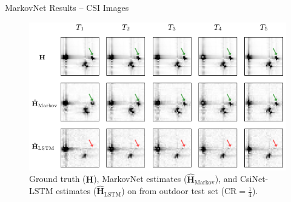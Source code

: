 \documentclass{beamer}
\begin{document}
  \begin{frame}{MarkovNet Results -- CSI Images}
    \begin{figure}[htb] \centering 
      \includegraphics[width=0.9\linewidth]{batch0_csi_compare_cr512_annot.pdf}
      \caption{Ground truth ($\mathbf H$), MarkovNet estimates ($\hat{\mathbf H}_{\text{Markov}}$), and CsiNet-LSTM estimates ($\hat{\mathbf H}_{\text{LSTM}}$) on from outdoor test set ($\text{CR}=\frac 14$).} 
      \label{fig:csi_img_compare} 
    \end{figure}
  \end{frame}
\end{document}
